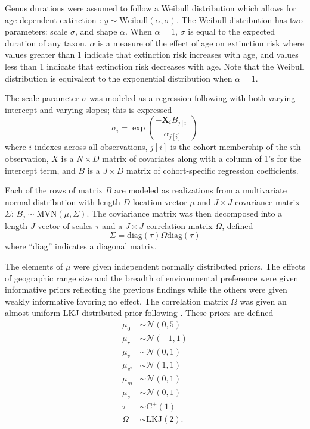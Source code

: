 \documentclass{article}
\begin{document}
Genus durations were assumed to follow a Weibull distribution which allows for age-dependent extinction \citep{Klein2003}: \(y \sim \mathrm{Weibull}(\alpha, \sigma)\). The Weibull distribution has two parameters: scale \(\sigma\), and shape \(\alpha\). When \(\alpha = 1\), \(\sigma\) is equal to the expected duration of any taxon. \(\alpha\) is a measure of the effect of age on extinction risk where values greater than 1 indicate that extinction risk increases with age, and values less than 1 indicate that extinction risk decreases with age. Note that the Weibull distribution is equivalent to the exponential distribution when \(\alpha = 1\). 

The scale parameter \(\sigma\) was modeled as a regression following \citet{Kleinbaum2005} with both varying intercept and varying slopes; this is expressed
\begin{equation}
  \sigma_{i} = \exp\left(\frac{-\mathbf{X}_{i} B_{j[i]}}{\alpha_{j[i]}}\right)
  \label{eq:sigma}
\end{equation}
where \(i\) indexes across all observations, \(j[i]\) is the cohort membership of the \(i\)th observation, \(X\) is a \(N \times D\) matrix of covariates along with a column of 1's for the intercept term, and \(B\) is a \(J \times D\) matrix of cohort-specific regression coefficients.

Each of the rows of matrix \(B\) are modeled as realizations from a multivariate normal distribution with length \(D\) location vector \(\mu\) and \(J \times J\) covariance matrix \(\Sigma\): \(B_{j} \sim \mathrm{MVN}(\mu, \Sigma)\). The coviariance matrix was then decomposed into a length \(J\) vector of scales \(\tau\) and a \(J \times J\) correlation matrix \(\Omega\), defined
\begin{equation}
  \Sigma = \mathrm{diag}(\tau) \Omega \mathrm{diag}(\tau)
\end{equation}
where ``diag'' indicates a diagonal matrix.

The elements of \(\mu\) were given independent normally distributed priors. The effects of geographic range size  and the breadth of environmental preference were given informative priors reflecting the previous findings while the others were given weakly informative favoring no effect. The correlation matrix \(\Omega\) was given an almost uniform LKJ distributed prior following \citep{Team2016}. These priors are defined
\begin{equation}
  \begin{aligned}
    \mu_{0} &\sim \mathcal{N}(0, 5) \\
    \mu_{r} &\sim \mathcal{N}(-1, 1) \\
    \mu_{v} &\sim \mathcal{N}(0, 1) \\
    \mu_{v^{2}} &\sim \mathcal{N}(1, 1) \\
    \mu_{m} &\sim \mathcal{N}(0, 1) \\
    \mu_{s} &\sim \mathcal{N}(0, 1) \\
    \tau &\sim \mathrm{C^{+}}(1) \\
    \Omega &\sim \text{LKJ}(2).
  \end{aligned}
  \label{eq:sigma_prior}
\end{equation}
\end{document}
